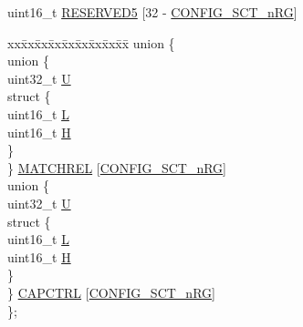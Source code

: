 \begin{DoxyCompactItemize}
\begin{tabbing}
\end{tabbing}\item 
uint16\+\_\+t \hyperlink{struct_l_p_c___s_c_t___t_a1571765dca30561b56c20827322274e0}{R\+E\+S\+E\+R\+V\+E\+D5} \mbox{[}32 -\/ \hyperlink{group___s_c_t__18_x_x__43_x_x_ga8d80e251208a01483a6b00c81ecb7493}{C\+O\+N\+F\+I\+G\+\_\+\+S\+C\+T\+\_\+n\+RG}\mbox{]}
\item 
\begin{tabbing}
xx\=xx\=xx\=xx\=xx\=xx\=xx\=xx\=xx\=\kill
union \{\\
\>union \{\\
\>\>uint32\_t \hyperlink{struct_l_p_c___s_c_t___t_a0be9245237cb05f7d9f5b1a9be51dfb0}{U}\\
\>\>struct \{\\
\>\>\>uint16\_t \hyperlink{struct_l_p_c___s_c_t___t_ac73594dbfa9ce3fcc7ce43435dad7b88}{L}\\
\>\>\>uint16\_t \hyperlink{struct_l_p_c___s_c_t___t_aadbde3d0fa10305e4c707635761c7082}{H}\\
\>\>\} \\
\>\} \hyperlink{struct_l_p_c___s_c_t___t_a54b6ca7b086d833d593c3ea84070cecd}{MATCHREL} \mbox{[}\hyperlink{group___s_c_t__18_x_x__43_x_x_ga8d80e251208a01483a6b00c81ecb7493}{CONFIG\_SCT\_nRG}\mbox{]}\\
\>union \{\\
\>\>uint32\_t \hyperlink{struct_l_p_c___s_c_t___t_a0be9245237cb05f7d9f5b1a9be51dfb0}{U}\\
\>\>struct \{\\
\>\>\>uint16\_t \hyperlink{struct_l_p_c___s_c_t___t_ac73594dbfa9ce3fcc7ce43435dad7b88}{L}\\
\>\>\>uint16\_t \hyperlink{struct_l_p_c___s_c_t___t_aadbde3d0fa10305e4c707635761c7082}{H}\\
\>\>\} \\
\>\} \hyperlink{struct_l_p_c___s_c_t___t_aaa6f62e50b846cadd0bcbc8364836369}{CAPCTRL} \mbox{[}\hyperlink{group___s_c_t__18_x_x__43_x_x_ga8d80e251208a01483a6b00c81ecb7493}{CONFIG\_SCT\_nRG}\mbox{]}\\
\}; \\


\end{tabbing}
\end{DoxyCompactItemize}
